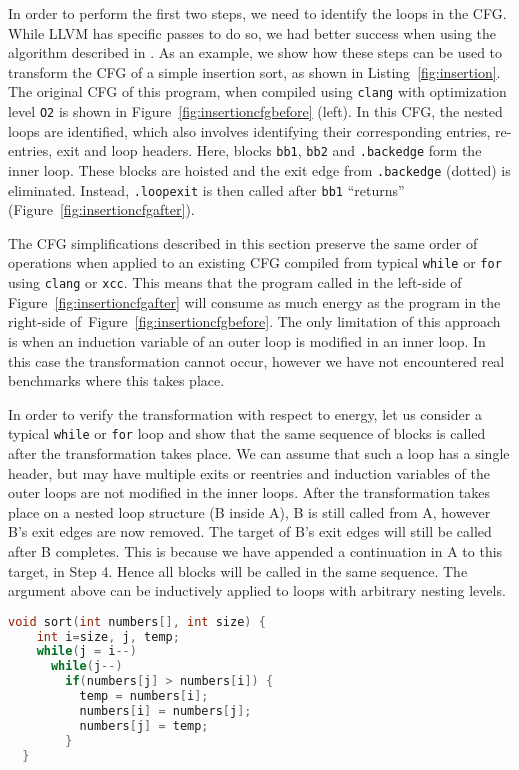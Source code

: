 \documentclass[9pt,preprint]{sigplanconf}
\newcommand{\figref}[1]{Figure~\ref{fig:#1}}
\begin{document}
In order to perform the first two steps, we need to identify the loops in the
CFG. While LLVM has specific passes to do so, we had better success when using
the algorithm described in \cite{Wei2007}. As an example, we show how these
steps can be used to transform the CFG of a simple insertion sort, as shown in
Listing~\ref{fig:insertion}. The original CFG of this program, when compiled using
\texttt{clang} with optimization level \texttt{O2} is shown in
\figref{insertioncfgbefore} (left). In this CFG, the nested loops are identified, which
also involves identifying their corresponding entries, re-entries, exit and loop
headers. Here, blocks \texttt{bb1}, \texttt{bb2} and
\texttt{.backedge} form the inner loop. These blocks are hoisted and the exit
edge from \texttt{.backedge} (dotted) is eliminated. Instead, \texttt{.loopexit}
is then called after \texttt{bb1} ``returns'' (\figref{insertioncfgafter}).


The CFG simplifications described in this section preserve the same order of
operations when applied to an existing CFG compiled from typical \texttt{while}
or \texttt{for} using \texttt{clang} or \texttt{xcc}. This means that the program
called in the left-side of \figref{insertioncfgafter} will consume as much
energy as the program in the right-side of~\figref{insertioncfgbefore}. The only limitation of this approach is
when an induction variable of an outer loop is modified in an inner
loop. In this case the transformation cannot occur, however we have not
encountered real benchmarks where this takes place.

In order to verify the transformation with respect to energy, let us consider a
typical \texttt{while} or \texttt{for} loop and show that the same sequence of
blocks is called after the transformation takes place. We can assume that such a
loop has a single header, but may have multiple exits or reentries and induction
variables of the outer loops are not modified in the inner loops. After the
transformation takes place on a nested loop structure (B inside A), B is still
called from A, however B's exit edges are now removed. The target of B's
exit edges will still be called after B completes. This is because we have
appended a continuation in A to this target, in Step 4. Hence all blocks will be
called in the same sequence. The argument above can be inductively applied to
loops with arbitrary nesting levels.

\begin{lstlisting}[language=C,float,caption={This insertion sort demonstrates that certain classes of programs require further analysis or transformation.},label=fig:insertion]
  void sort(int numbers[], int size) {
    int i=size, j, temp;
    while(j = i--)
      while(j--)
        if(numbers[j] > numbers[i]) {
          temp = numbers[i];
          numbers[i] = numbers[j];
          numbers[j] = temp;
        }
  }
\end{lstlisting}
\end{document}
